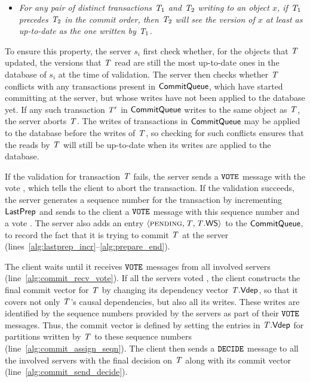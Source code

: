 \begin{itemize}
    \item \emph{For any pair of distinct transactions $\mathit{T}_1$ and $\mathit{T}_2$ writing to an object $x$, if $\mathit{T}_1$ precedes $\mathit{T}_2$ in the commit order, then $\mathit{T}_2$ will see the version of $x$ at least as up-to-date as the one written by $\mathit{T}_1$.}
\end{itemize}

To ensure this property, the server $s_i$ first check whether, for the objects that $\mathit{T}$ updated, the versions that $\mathit{T}$ read are still the most up-to-date ones in the database of $s_i$ at the time of validation. The server then checks whether $\mathit{T}$ conflicts with any transactions present in $\mathsf{CommitQueue}$, which have started committing at the server, but whose writes have not been applied to the database yet. If any such transaction $\mathit{T}'$ in $\mathsf{CommitQueue}$ writes to the same object as $\mathit{T}$, the server aborts $\mathit{T}$. The writes of transactions in $\mathsf{CommitQueue}$ may be applied to the database before the writes of $\mathit{T}$, so checking for such conflicts ensures that the reads by $\mathit{T}$ will still be up-to-date when its writes are applied to the database.

If the validation for transaction $\mathit{T}$ fails, the server sends a ${\tt VOTE}$ message with the vote \abort, which tells the client to abort the transaction. If the validation succeeds, the server generates a sequence number for the transaction by incrementing $\mathsf{LastPrep}$ and sends to the client a ${\tt VOTE}$ message with this sequence number and a vote \commit. The server also adds an entry $\langle \text{\sc pending}, \mathit{T}, \mathit{T}.\mathsf{WS} \rangle$ to the $\mathsf{CommitQueue}$, to record the fact that it is trying to commit $\mathit{T}$ at the server (lines~\ref{alg:lastprep_incr}--\ref{alg:prepare_end}).

The client waits until it receives ${\tt VOTE}$ messages from all involved servers (line~\ref{alg:commit_recv_vote}). If all the servers voted \commit, the client constructs the final commit vector for $\mathit{T}$ by changing its dependency vector $\mathit{T}.\mathsf{Vdep}$, so that it covers not only $\mathit{T}$'s causal dependencies, but also all its writes. These writes are identified by the sequence numbers provided by the servers as part of their ${\tt VOTE}$ messages. Thus, the commit vector is defined by setting the entries in $\mathit{T}.\mathsf{Vdep}$ for partitions written by $\mathit{T}$ to these sequence numbers (line~\ref{alg:commit_assign_seqn}). The client then sends a ${\tt DECIDE}$ message to all the involved servers with the final decision on $\mathit{T}$ along with its commit vector (line~\ref{alg:commit_send_decide}).

